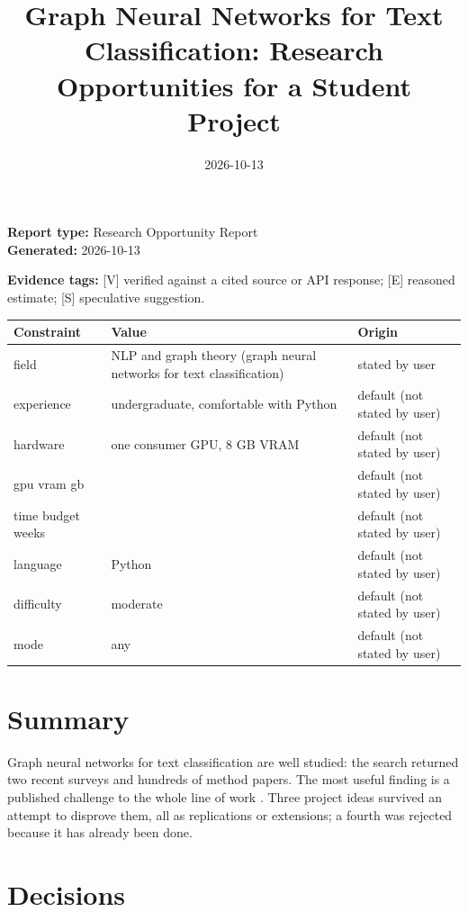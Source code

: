 \documentclass[11pt,a4paper]{article}
\title{Graph Neural Networks for Text Classification: Research Opportunities for a Student Project}
\date{2026-10-13}
\begin{document}
\maketitle


\textbf{Report type:} Research Opportunity Report\\
\textbf{Generated:} 2026-10-13

\textbf{Evidence tags:} [V] verified against a cited source or API response; [E] reasoned estimate; [S] speculative suggestion.

{\small
\begin{longtable}{>{\raggedright\arraybackslash}p{}>{\raggedright\arraybackslash}p{}>{\raggedright\arraybackslash}p{}}
\toprule
\textbf{Constraint} & \textbf{Value} & \textbf{Origin} \\
\midrule
\endhead
field & NLP and graph theory (graph neural networks for text classification) & stated by user \\
experience & undergraduate, comfortable with Python & default (not stated by user) \\
hardware & one consumer GPU, 8 GB VRAM & default (not stated by user) \\
gpu vram gb & 8 & default (not stated by user) \\
time budget weeks & 8 & default (not stated by user) \\
language & Python & default (not stated by user) \\
difficulty & moderate & default (not stated by user) \\
mode & any & default (not stated by user) \\
\bottomrule
\end{longtable}
}

\section{Summary}

Graph neural networks for text classification are well studied: the search returned two recent surveys \cite{wang2024,rizvi2025} and hundreds of method papers. The most useful finding is a published challenge to the whole line of work \cite{galke2022}. Three project ideas survived an attempt to disprove them, all as replications or extensions; a fourth was rejected because it has already been done.

\section{Decisions}
\end{document}
